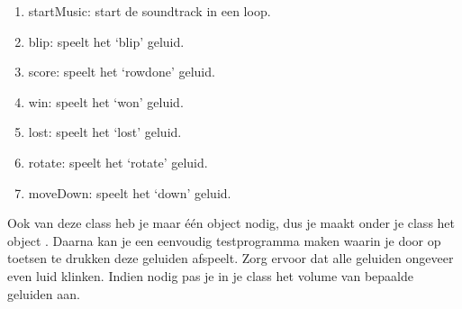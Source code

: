 \begin{enumerate}
  \item startMusic: start de soundtrack in een loop.
	\item blip: speelt het `blip' geluid.
	\item score: speelt het `rowdone' geluid.
	\item win: speelt het `won' geluid.
	\item lost: speelt het `lost' geluid.
	\item rotate: speelt het `rotate' geluid.
	\item moveDown: speelt het `down' geluid.
\end{enumerate}

Ook van deze class heb je maar \'e\'en object nodig, dus je maakt onder je class het object . Daarna kan je een eenvoudig testprogramma maken waarin je door op toetsen te drukken deze geluiden afspeelt. Zorg ervoor dat alle geluiden ongeveer even luid klinken. Indien nodig pas je in je class het volume van bepaalde geluiden aan.
